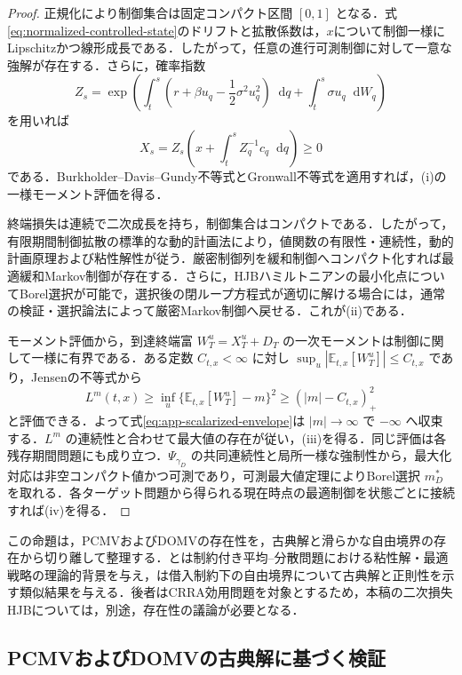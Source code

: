 \documentclass[10pt,a4paper]{article}
\theoremstyle{plain}
\theoremstyle{definition}
\newcommand{\E}{\mathbb{E}}
\newcommand{\dd}{\mathop{}\!\mathrm{d}}
\begin{document}
\begin{proof}
正規化により制御集合は固定コンパクト区間 $[0,1]$ となる．式\eqref{eq:normalized-controlled-state}のドリフトと拡散係数は，$x$について制御一様にLipschitzかつ線形成長である．したがって，任意の進行可測制御に対して一意な強解が存在する．さらに，確率指数
\[
 Z_s=\exp\!\left(
  \int_t^s\!\left(r+\beta u_q-\frac12\sigma^2u_q^2\right)\dd q
  +\int_t^s\!\sigma u_q\dd W_q
 \right)
\]
を用いれば
\begin{equation}
 X_s=Z_s\left(x+\int_t^s Z_q^{-1}c_q\dd q\right)\geq0
 \label{eq:app-state-explicit}
\end{equation}
である．Burkholder--Davis--Gundy不等式とGronwall不等式を適用すれば，(i)の一様モーメント評価を得る．

終端損失は連続で二次成長を持ち，制御集合はコンパクトである．したがって，有限期間制御拡散の標準的な動的計画法により，値関数の有限性・連続性，動的計画原理および粘性解性が従う\citep{FlemingSoner2006}．厳密制御列を緩和制御へコンパクト化すれば最適緩和Markov制御が存在する．さらに，HJBハミルトニアンの最小化点についてBorel選択が可能で，選択後の閉ループ方程式が適切に解ける場合には，通常の検証・選択論法によって厳密Markov制御へ戻せる．これが(ii)である．

モーメント評価から，到達終端富 $W_T^u=X_T^u+D_T$ の一次モーメントは制御に関して一様に有界である．ある定数 $C_{t,x}<\infty$ に対し $\sup_u|\E_{t,x}[W_T^u]|\leq C_{t,x}$ であり，Jensenの不等式から
\[
 L^m(t,x)
 \geq \inf_u\{\E_{t,x}[W_T^u]-m\}^2
 \geq (|m|-C_{t,x})_+^2
\]
と評価できる．よって式\eqref{eq:app-scalarized-envelope}は $|m|\to\infty$ で $-\infty$ へ収束する．$L^m$ の連続性と合わせて最大値の存在が従い，(iii)を得る．同じ評価は各残存期間問題にも成り立つ．$\Psi_{\gamma_D}$ の共同連続性と局所一様な強制性から，最大化対応は非空コンパクト値かつ可測であり，可測最大値定理によりBorel選択 $m_D^*$ を取れる．各ターゲット問題から得られる現在時点の最適制御を状態ごとに接続すれば(iv)を得る．
\end{proof}

この命題は，PCMVおよびDOMVの存在性を，古典解と滑らかな自由境界の存在から切り離して整理する．\citet{LiZhouLim2002}と\citet{LiXu2016}は制約付き平均--分散問題における粘性解・最適戦略の理論的背景を与え，\citet{GuanLiZhouZhou2022}は借入制約下の自由境界について古典解と正則性を示す類似結果を与える．後者はCRRA効用問題を対象とするため，本稿の二次損失HJBについては，別途，存在性の議論が必要となる．

\subsection{PCMVおよびDOMVの古典解に基づく検証}
\label{app:pcmv-proof}
\end{document}
